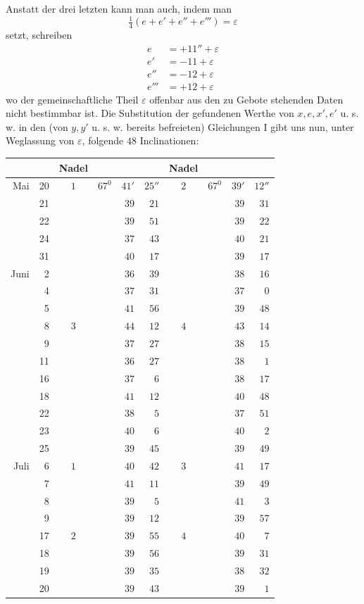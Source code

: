 Anstatt der drei letzten kann man auch, indem man
\[
\tfrac14(e+e'+e''+e''')=\varepsilon
\]
setzt, schreiben
\[
\begin{aligned}
e&=+11''+\varepsilon\\
e'&=-11+\varepsilon\\
e''&=-12+\varepsilon\\
e'''&=+12+\varepsilon
\end{aligned}
\]
wo der gemeinschaftliche Theil $\varepsilon$ offenbar aus den zu Gebote stehenden Daten nicht bestimmbar ist. Die Substitution der gefundenen Werthe von $x,e,x',e'$ u. s. w. in den (von $y,y'$ u. s. w. bereits befreieten) Gleichungen I gibt uns nun, unter Weglassung von $\varepsilon$, folgende $48$ Inclinationen:
\begin{center}
\begin{tabular}{rr|c|rrr||c|rrr}
&&Nadel&&&&Nadel&&&\\\hline
Mai&20&$1$&$67^0$&$41'$&$25''$&$2$&$67^0$&$39'$&$12''$\\
&21&&&$39$&$21$&&&$39$&$31$\\
&22&&&$39$&$51$&&&$39$&$22$\\
&24&&&$37$&$43$&&&$40$&$21$\\
&31&&&$40$&$17$&&&$39$&$17$\\
Juni&2&&&$36$&$39$&&&$38$&$16$\\
&4&&&$37$&$31$&&&$37$&$0$\\
&5&&&$41$&$56$&&&$39$&$48$\\
&8&$3$&&$44$&$12$&$4$&&$43$&$14$\\
&9&&&$37$&$27$&&&$38$&$15$\\
&11&&&$36$&$27$&&&$38$&$1$\\
&16&&&$37$&$6$&&&$38$&$17$\\
&18&&&$41$&$12$&&&$40$&$48$\\
&22&&&$38$&$5$&&&$37$&$51$\\
&23&&&$40$&$6$&&&$40$&$2$\\
&25&&&$39$&$45$&&&$39$&$49$\\
Juli&6&$1$&&$40$&$42$&$3$&&$41$&$17$\\
&7&&&$41$&$11$&&&$39$&$49$\\
&8&&&$39$&$5$&&&$41$&$3$\\
&9&&&$39$&$12$&&&$39$&$57$\\
&17&$2$&&$39$&$55$&$4$&&$40$&$7$\\
&18&&&$39$&$56$&&&$39$&$31$\\
&19&&&$39$&$35$&&&$38$&$32$\\
&20&&&$39$&$43$&&&$39$&$1$
\end{tabular}
\end{center}

